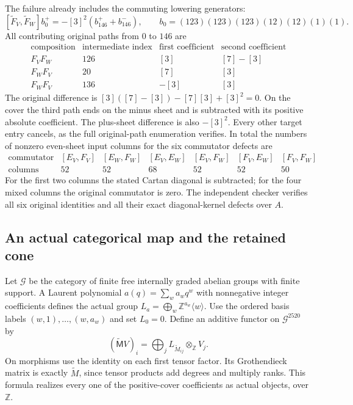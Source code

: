 The failure already includes the commuting lowering generators:
\begin{equation}\label{eq:positive-source-mixed-defect}
 [\widetilde F_V,\widetilde F_W]b_0^+
       =-[3]^2(b_{146}^++b_{146}^-),
 \qquad b_0=(123)(123)(123)(12)(12)(1)(1).
\end{equation}
All contributing original paths from $0$ to $146$ are
\[
\begin{array}{c|r|c|c}
\text{composition}&\text{intermediate index}&\text{first coefficient}
                                         &\text{second coefficient}\\\hline
 F_VF_W&126&[3]&[7]-[3]\\
 F_WF_V&20&[7]&[3]\\
 F_WF_V&136&-[3]&[3]
\end{array}
\]
The original difference is $[3]([7]-[3])-[7][3]+[3]^2=0$.
On the cover the third path ends on the minus sheet and is
subtracted with its positive absolute coefficient. The plus-sheet
difference is also $-[3]^2$. Every other target entry cancels,
as the full original-path enumeration verifies. In total the
numbers of nonzero even-sheet input columns for the six
commutator defects are
\[
\begin{array}{c|rrrrrr}
\text{commutator}&[E_V,F_V]&[E_W,F_W]&[E_V,E_W]&[E_V,F_W]
                  &[F_V,E_W]&[F_V,F_W]\\\hline
\text{columns}&52&52&68&52&52&50
\end{array}
\]
For the first two columns the stated Cartan diagonal is subtracted;
for the four mixed columns the original commutator is zero.
The independent checker verifies all six original identities and
all their exact diagonal-kernel defects over $A$.

\subsection{An actual categorical map and the retained cone}

Let $\mathcal G$ be the category of finite free internally graded
abelian groups with finite support. A Laurent polynomial
$a(q)=\sum_w a_wq^w$ with nonnegative integer coefficients defines
the actual group $L_a=\bigoplus_w\mathbb Z^{a_w}\langle w\rangle$.
Use the ordered basis labels $(w,1),\ldots,(w,a_w)$ and set $L_0=0$.
Define an additive functor on $\mathcal G^{2520}$ by
\[
 (\widetilde{\mathsf M}V)_i
       =\bigoplus_j L_{\widetilde M_{ij}}\otimes_{\mathbb Z}V_j.
\]
On morphisms use the identity on each first tensor factor. Its
Grothendieck matrix is exactly $\widetilde M$, since tensor products
add degrees and multiply ranks. This formula realizes every one of
the positive-cover coefficients as actual objects, over $\mathbb Z$.

